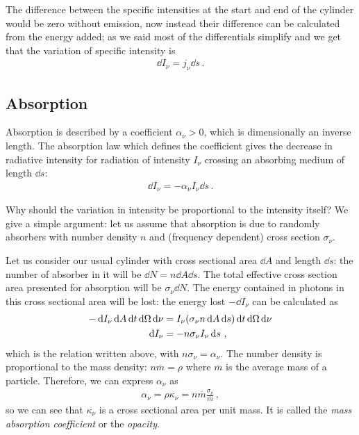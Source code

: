 \documentclass[main.tex]{subfiles}
\begin{document}
The difference between the specific intensities at the start and end of the cylinder would be zero without emission, now instead their difference can be calculated from the energy added; as we said most of the differentials simplify and we get that the variation of specific intensity is
%
\begin{align}
\dd{I_{\nu }} = j_{\nu } \dd{s}
\,.
\end{align}

\subsection{Absorption}

Absorption is described by a coefficient \(\alpha_{\nu }>0\), which is dimensionally an inverse length. 
The absorption law which defines the coefficient gives the decrease in radiative intensity for radiation of intensity \(I_{\nu }\) crossing an absorbing medium of length \(\dd{s}\):
%
\begin{align}
\dd{I_{\nu }} =- \alpha_{\nu } I_{\nu } \dd{s}
\,.
\end{align}

Why should the variation in intensity be proportional to the intensity itself? We give a simple argument: 
let us assume that absorption is due to randomly absorbers with number density \(n\) and (frequency dependent) cross section \(\sigma_{\nu }\).  

Let us consider our usual cylinder with cross sectional area \(\dd{A}\) and length \(\dd{s}\): the number of absorber in it will be \(\dd{N} = n \dd{A} \dd{s}\). 
The total effective cross section area presented for absorption will be \(\sigma_{\nu } \dd{N}\). 
The energy contained in photons in this cross sectional area will be lost: the energy lost \(- \dd{I_{\nu }}\) can be calculated as 
%
\begin{subequations}
\begin{align}
- \dd{I_{\nu }} \dd{A} \dd{t} \dd{\Omega} \dd{\nu }
&=  I_{\nu } \qty(\sigma_{\nu } n \dd{A} \dd{s}) \dd{t} \dd{\Omega } \dd{\nu }  \\
\dd{I_{\nu }} &= - n \sigma_{\nu } I_{\nu } \dd{s}
\,,
\end{align}
\end{subequations}
%
which is the relation written above, with \(n \sigma_{\nu } = \alpha_{\nu }\). 
The number density is proportional to the mass density: \(n \overline{m} = \rho \) where \(\overline{m} \) is the average mass of a particle. Therefore, we can express \(\alpha_{\nu }\) as 
%
\begin{align}
\alpha_{\nu } = \rho \kappa_{\nu } = n \overline{m} \frac{ \sigma_{\nu }}{\overline{m}}
\,,
\end{align}
%
so we can see that \(\kappa_{\nu }\) is a cross sectional area per unit mass. It is called the \emph{mass absorption coefficient} or the \emph{opacity}. 
\end{document}
